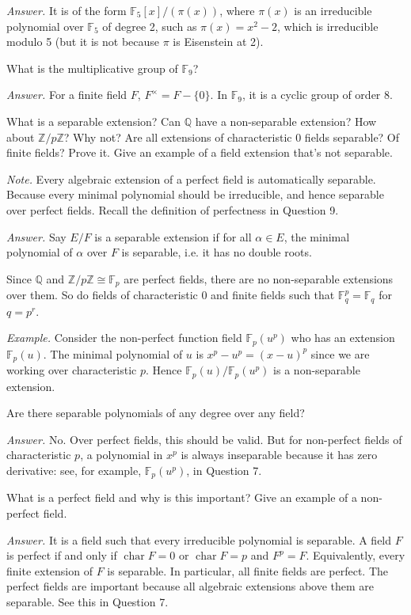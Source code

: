 \documentclass{mathproblems}
\newcommand\Q{\mathbb{Q}}
\newcommand\Z{\mathbb{Z}}
\newcommand\F{\mathbb{F}}
\begin{document}
\begin{questions}
\textit{Answer.}
It is of the form $\F_5[x]/(\pi(x))$, where $\pi(x)$ is an irreducible polynomial over $\F_5$ of degree 2, such as $\pi(x)=x^2-2$, which is irreducible modulo 5 (but it is not because $\pi$ is Eisenstein at 2).

\miquestion
{\color{blue} What is the multiplicative group of $\F_{9}$?}

\textit{Answer.}
For a finite field $F$, $F^\times=F-\{0\}$. In $\F_9$, it is a cyclic group of order $8$.

\miquestion
{\color{blue} What is a separable extension? Can $\Q$ have a non-separable extension? How about $\Z / p \Z$? Why not? Are all extensions of characteristic 0 fields separable? Of finite fields? Prove it. Give an example of a field extension that's not separable.}

{\color{violet} \textit{Note.} Every algebraic extension of a perfect field is automatically separable. Because every minimal polynomial should be irreducible, and hence separable over perfect fields. Recall the definition of perfectness in Question 9.}

\textit{Answer.} Say $E/F$ is a separable extension if for all $\alpha\in E$, the minimal polynomial of $\alpha$ over $F$ is separable, i.e. it has no double roots.

Since $\Q$ and $\Z/p\Z\cong \F_p$ are perfect fields, there are no non-separable extensions over them. So do fields of characteristic 0 and finite fields such that $\F_q^p=\F_q$ for $q=p^r$.

\textit{Example.} Consider the non-perfect function field $\F_p(u^p)$ who has an extension $\F_p(u)$. The minimal polynomial of $u$ is $x^p-u^p=(x-u)^p$ since we are working over characteristic $p$. Hence $\F_p(u)/\F_p(u^p)$ is a non-separable extension.

\miquestion
{\color{blue} Are there separable polynomials of any degree over any field?}

\textit{Answer.} No. Over perfect fields, this should be valid. But for non-perfect fields of characteristic $p$, a polynomial in $x^p$ is always inseparable because it has zero derivative: see, for example, $\F_p(u^p)$, in Question 7.

\miquestion
{\color{blue} What is a perfect field and why is this important? Give an example of a non-perfect field.}

\textit{Answer.}
It is a field such that every irreducible polynomial is separable. A field $F$ is perfect if and only if $\operatorname{char} F=0$ or $\operatorname{char} F=p$ and $F^p=F$. Equivalently, every finite extension of $F$ is separable. In particular, all finite fields are perfect. The perfect fields are important because all algebraic extensions above them are separable. See this in Question 7.


\end{questions}
\end{document}
